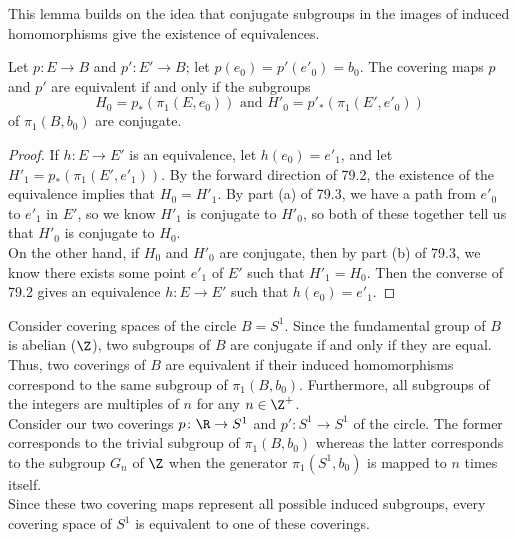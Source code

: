 \begin{remark}
This lemma builds on the idea that conjugate subgroups in the images of induced homomorphisms give the existence of equivalences.
\end{remark}

\begin{theorem}
Let $p \colon E \rightarrow B$ and $p' \colon E' \rightarrow B$; let $p(e_0) = p'(e'_0) = b_0$. The covering maps $p$ and $p'$ are equivalent if and only if the subgroups
\[
    H_0 = p_*(\pi_1(E, e_0)) \text{ and } H'_0 = p'_*(\pi_1(E', e'_0))
\]
of $\pi_1(B, b_0)$ are conjugate.
\end{theorem}

\begin{proof}
If $h \colon E \rightarrow E'$ is an equivalence, let $h(e_0) = e'_1$, and let $H'_1 = p_*(\pi_1(E', e'_1))$. By the forward direction of 79.2, the existence of the equivalence implies that $H_0 = H'_1$. By part (a) of 79.3, we have a path from $e'_0$ to $e'_1$ in $E'$, so we know $H'_1$ is conjugate to $H'_0$, so both of these together tell us that $H'_0$ is conjugate to $H_0$. \\

On the other hand, if $H_0$ and $H'_0$ are conjugate, then by part (b) of 79.3, we know there exists some point $e'_1$ of $E'$ such that $H'_1 = H_0$. Then the converse of 79.2 gives an equivalence $h \colon E \rightarrow E'$ such that $h(e_0) = e'_1$.
\end{proof}

\begin{eg}
Consider covering spaces of the circle $B = S^1$. Since the fundamental group of $B$ is abelian ($\Z$), two subgroups of $B$ are conjugate if and only if they are equal. Thus, two coverings of $B$ are equivalent if their induced homomorphisms correspond to the same subgroup of $\pi_1(B, b_0)$. Furthermore, all subgroups of the integers are multiples of $n$ for any $n \in \Z^+$. \\

Consider our two coverings $p \colon \R \rightarrow S^1$ and $p': S^1 \rightarrow S^1$ of the circle. The former corresponds to the trivial subgroup of $\pi_1(B, b_0)$ whereas the latter corresponds to the subgroup $G_n$ of $\Z$ when the generator $\pi_1(S^1, b_0)$ is mapped to $n$ times itself. \\

Since these two covering maps represent all possible induced subgroups, every covering space of $S^1$ is equivalent to one of these coverings. 
\end{eg}

